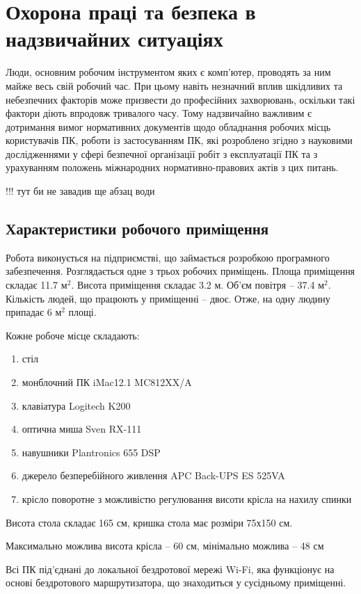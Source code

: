 \documentclass[a4paper,12pt]{article}
\begin{document}
\onehalfspacing
\large

\section{Охорона праці та безпека в надзвичайних ситуаціях}

Люди, основним робочим інструментом яких є комп’ютер, проводять за ним майже весь свій робочий час. При цьому навіть незначний вплив шкідливих та небезпечних факторів може призвести до професійних захворювань, оскільки такі фактори діють впродовж тривалого часу. Тому надзвичайно важливим є дотримання вимог нормативних документів щодо обладнання робочих місць користувачів ПК, роботи із застосуванням ПК, які розроблено згідно з  науковими дослідженнями у сфері безпечної організації робіт з експлуатації ПК та з урахуванням положень міжнародних нормативно-правових актів з цих питань.

!!! тут би не завадив ще абзац води

\subsection{Характеристики робочого приміщення}
Робота виконується на підприємстві, що займається розробкою програмного забезпечення. Розглядається одне з трьох робочих приміщень. Площа приміщення складає 11.7 $\text{м}^2$. Висота приміщення складає 3.2 м. Об’єм повітря -- 37.4 $\text{м}^2$. Кількість людей, що працюють у приміщенні -- двоє. Отже, на одну людину припадає 6 $\text{м}^2$ площі.

Кожне робоче місце складають:
\begin{enumerate}
\item стіл
\item монблочний ПК iMac12.1 MC812XX/A
\item клавіатура Logitech K200
\item оптична миша Sven RX-111
\item навушники Plantronics 655 DSP
\item джерело безперебійного живлення APC Back-UPS ES 525VA
\item крісло поворотне з можливістю регулювання висоти крісла на нахилу спинки
\end{enumerate}

Висота стола складає 165 см, кришка стола має розміри 75х150 см.

Максимально можлива висота крісла -- 60 см, мінімально можлива -- 48 см

Всі ПК під’єднані до локальної бездротової мережі Wi-Fi, яка функціонує на основі бездротового маршрутизатора, що знаходиться у сусідньому приміщенні.
\end{document}
